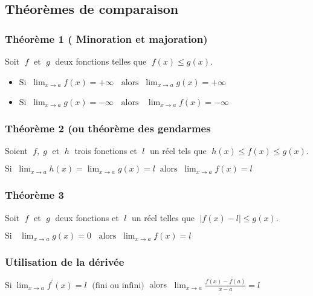       \subsection{Théorèmes de comparaison}
\subsubsection*{Théorème 1 ( Minoration et  majoration)}
     \begin{theorem}
           Soit $\;f \;$ et $\;g \;$  deux fonctions telles que $\;   f(x)\leq g(x) $.
        \begin{itemize}           
         \item  $  \text{Si}\; \;\displaystyle \lim_{x \to a}{f(x)} =+\infty \;\; \text{ alors} \;\; \displaystyle\lim_{x \to a}{g(x)} =+\infty$
          
          
        \item   $ \text{Si}\;\; \displaystyle \lim_{x \to a}{g(x)} =-\infty \;\; \text{ alors }\;\; \lim_{x \to a}{f(x)} =-\infty$
          \end{itemize}
       \end{theorem}
     
      \subsubsection*{Théorème 2 (ou théorème  des gendarmes}
          \begin{theorem}
            Soient  $\; f  , \; g  \; $  et  $ \; h \;$  trois fonctions et  $\;l \;$ un réel tels que  $ \; h(x)\leq f(x) \leq g(x).$
            
           $ \text{Si}\;  \; \displaystyle\lim_{x \to a}{h(x)} =\displaystyle\lim_{x \to a}{g(x)}=l  \;\; \text{alors} \;\; \lim_{x \to a}{f(x)} =l$ 
       \end{theorem}
     \subsubsection*{Théorème 3}
      \begin{theorem} Soit $\;  f \; $ et $\; g \;$  deux fonctions et $\; l  \; $  un réel telles que $\;\left|f(x)-l\right| \leq g(x).$
      
     $ \text{Si }\; \;\displaystyle\lim_{x \to a}{g(x)} =0 \;\; \text{ alors}\; \;\displaystyle \lim_{x \to a}{f(x)} =l$
     \end{theorem}
      \subsubsection*{Utilisation de la dérivée}
     \begin{theorem}
           $ \text{Si} \;\displaystyle\lim_{x \to a}{f^{\prime}(x)} =l\; \text{ (fini ou infini)}\;$   alors $  \; \displaystyle\lim_{x \to a}{\frac{f(x)-f(a)}{x-a}} =l$
            \end{theorem}

